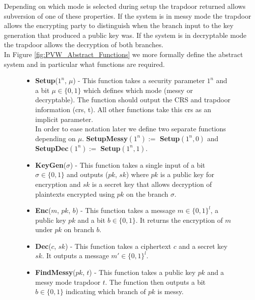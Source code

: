 \documentclass[ %
                    author={Nicholas Tutte},
                supervisor={Prof. Nigel Smart},
                    degree={MEng},
                     title={Secure Two Party Computation},
                  subtitle={A practical comparison of recent protocols},
                      type={Research - GG1K},
                      year={2015} ]{dissertation}
\begin{document}
					Depending on which mode is selected during setup the trapdoor returned allows subversion of one of these properties. If the system is in messy mode the trapdoor allows the encrypting party to distinguish when the branch input to the key generation that produced a public key was. If the system is in decryptable mode the trapdoor allows the decryption of both branches.\\

					In Figure \ref{fig:PVW_Abstract_Functions} we more formally define the abstract system and in particular what functions are required.\\

					\begin{figure}[!htb]
						\begin{mdframed}
							\centering
							\begin{itemize}
								\item \textbf{Setup}($1^n$, $\mu$) - This function takes a security parameter $1^n$ and a bit $\mu \in \{0, 1\}$ which defines which mode (messy or decryptable). The function should output the CRS and trapdoor information (crs, t). All other functions take this crs as an implicit parameter.\\[0.25cm]

								In order to ease notation later we define two separate functions depending on $\mu$. \textbf{SetupMessy}$(1^n) :=$ \textbf{Setup}$(1^n, 0)$ and \textbf{SetupDec}$(1^n) :=$ \textbf{Setup}$(1^n, 1)$.\\[0.25cm]


								\item \textbf{KeyGen}($\sigma$) - This function takes a single input of a bit $\sigma \in \{0, 1\}$ and outputs ($pk$, $sk$) where $pk$ is a public key for encryption and $sk$ is a secret key that allows decryption of plaintexts encrypted using $pk$ on the branch $\sigma$.

								\item \textbf{Enc}($m$, $pk$, $b$) - This function takes a message $m \in \{0, 1\}^l$, a public key $pk$ and a bit $b \in \{0, 1\}$. It returns the encryption of $m$ under $pk$ on branch $b$.

								\item \textbf{Dec}($c$, $sk$) - This function takes a ciphertext $c$ and a secret key $sk$. It outputs a message $m' \in \{0, 1\}^l$.

								\item \textbf{FindMessy}($pk$, $t$) - This function takes a public key $pk$ and a messy mode trapdoor $t$. The function then outputs a bit $b \in \{0, 1\}$ indicating which branch of $pk$ is messy.


\end{itemize}
\end{mdframed}
\end{figure}
\end{document}
